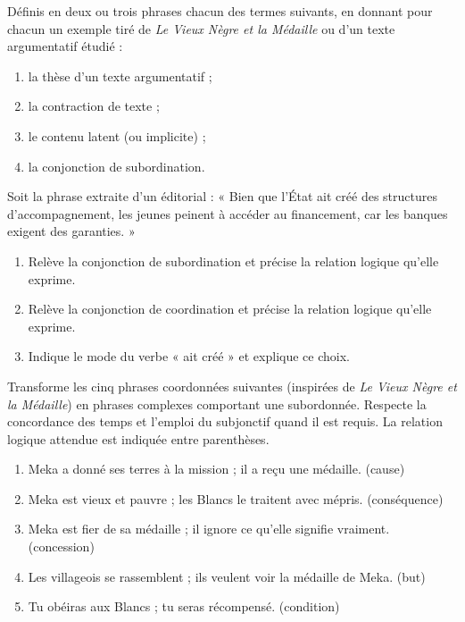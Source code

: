 \documentclass[11pt]{article}
\newcommand{\cle}[1]{{\popxbold\color{popdark}#1}}
\newcounter{popsec}
\newcounter{popsub}
\newcommand{\courssub}[1]{%
  \stepcounter{popsub}%
  \par\vspace{9pt}\noindent{\popxbold\fontsize{11.5}{13}\selectfont\color{popink}{\color{poporange}\thepopsec.\thepopsub}\hspace{6pt}#1}\par\nopagebreak\vspace{4pt}
}
\begin{document}
\begin{exercice}[Définitions]
Définis en deux ou trois phrases chacun des termes suivants, en donnant pour chacun un exemple tiré de \emph{Le Vieux Nègre et la Médaille} ou d'un texte argumentatif étudié :
\begin{enumerate}
\item la \cle{thèse} d'un texte argumentatif ;
\item la \cle{contraction de texte} ;
\item le \cle{contenu latent} (ou implicite) ;
\item la \cle{conjonction de subordination}.
\end{enumerate}
\end{exercice}

\begin{exercice}
Soit la phrase extraite d'un éditorial : « Bien que l'État ait créé des structures d'accompagnement, les jeunes peinent à accéder au financement, car les banques exigent des garanties. »
\begin{enumerate}
\item Relève la conjonction de subordination et précise la relation logique qu'elle exprime.
\item Relève la conjonction de coordination et précise la relation logique qu'elle exprime.
\item Indique le mode du verbe « ait créé » et explique ce choix.
\end{enumerate}
\end{exercice}

\courssub{Je m'entraîne}

\begin{exercice}
Transforme les cinq phrases coordonnées suivantes (inspirées de \emph{Le Vieux Nègre et la Médaille}) en phrases complexes comportant une subordonnée. Respecte la concordance des temps et l'emploi du subjonctif quand il est requis. La relation logique attendue est indiquée entre parenthèses.
\begin{enumerate}
\item Meka a donné ses terres à la mission ; il a reçu une médaille. (cause)
\item Meka est vieux et pauvre ; les Blancs le traitent avec mépris. (conséquence)
\item Meka est fier de sa médaille ; il ignore ce qu'elle signifie vraiment. (concession)
\item Les villageois se rassemblent ; ils veulent voir la médaille de Meka. (but)
\item Tu obéiras aux Blancs ; tu seras récompensé. (condition)
\end{enumerate}
\end{exercice}
\end{document}
